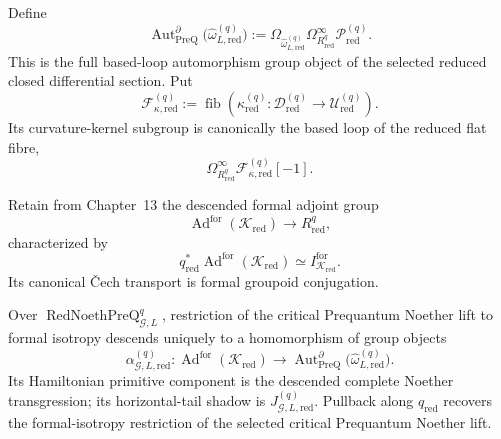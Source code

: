 \begin{definition}
\label{def:prequantum-reduced-automorphism-group-object}
Define
\[
\boxed{
\operatorname{Aut}^{\partial}_{\mathrm{PreQ}}
\bigl(\widehat\omega_{L,\mathrm{red}}^{(q)}\bigr)
:=
\Omega_{\widehat\omega_{L,\mathrm{red}}^{(q)}}
\Omega_{R_{\mathrm{red}}^q}^\infty
\mathscr P_{\mathrm{red}}^{(q)}.
}
\]
This is the full based-loop automorphism group object of the selected reduced
closed differential section.  Put
\[
\mathscr F_{\kappa,\mathrm{red}}^{(q)}
:=
\operatorname{fib}
(\kappa_{\mathrm{red}}^{(q)}:
 \mathscr D_{\mathrm{red}}^{(q)}\to\mathscr U_{\mathrm{red}}^{(q)}).
\]
Its curvature-kernel subgroup is canonically the based loop of the reduced flat
fibre,
\[
\Omega_{R_{\mathrm{red}}^q}^\infty
\mathscr F_{\kappa,\mathrm{red}}^{(q)}[-1].
\]
\end{definition}

Retain from Chapter~13 the descended formal adjoint group
\[
\operatorname{Ad}^{\mathrm{for}}(\mathcal K_{\mathrm{red}})
\longrightarrow R_{\mathrm{red}}^q,
\]
characterized by
\[
q_{\mathrm{red}}^*
\operatorname{Ad}^{\mathrm{for}}(\mathcal K_{\mathrm{red}})
\simeq
I^{\mathrm{for}}_{\mathcal K_{\mathrm{red}}}.
\]
Its canonical \v{C}ech transport is formal groupoid conjugation.

\begin{theorem}
\label{thm:prequantum-reduced-noether-theorem}
Over $\operatorname{RedNoethPreQ}_{\mathcal G,L}^{q}$, restriction of the
critical Prequantum Noether lift to formal isotropy descends uniquely to a
homomorphism of group objects
\[
\boxed{
\alpha_{\mathcal G,L,\mathrm{red}}^{(q)}:
\operatorname{Ad}^{\mathrm{for}}
(\mathcal K_{\mathrm{red}})
\longrightarrow
\operatorname{Aut}^{\partial}_{\mathrm{PreQ}}
\bigl(\widehat\omega_{L,\mathrm{red}}^{(q)}\bigr).
}
\]
Its Hamiltonian primitive component is the descended complete Noether
transgression; its horizontal-tail shadow is
$J_{\mathcal G,L,\mathrm{red}}^{(q)}$.  Pullback along $q_{\mathrm{red}}$ recovers
the formal-isotropy restriction of the selected critical Prequantum Noether
lift.
\end{theorem}

